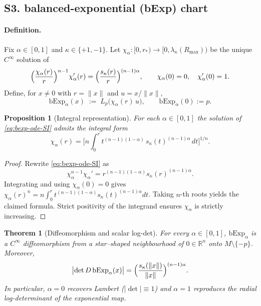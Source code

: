 \documentclass{article}
\newtheorem{theorem}{Theorem}
\newtheorem{proposition}{Proposition}
\theoremstyle{definition}
\theoremstyle{remark}
\begin{document}
\subsection*{S3. balanced-exponential (bExp) chart}

\paragraph{Definition.}
Fix $\alpha\in[0,1]$ and $\kappa\in\{+1,-1\}$. Let $\chi_\alpha:[0,r_*)\to[0,\lambda_\kappa(R_{\max}))$ be the unique
$C^\infty$ solution of
\begin{equation}
\Bigl(\frac{\chi_\alpha(r)}{r}\Bigr)^{n-1}\chi'_\alpha(r)
=
\Bigl(\frac{s_\kappa(r)}{r}\Bigr)^{(n-1)\alpha},
\qquad
\chi_\alpha(0)=0,\quad \chi'_\alpha(0)=1.
\label{eq:bexp-ode-SI}
\end{equation}
Define, for $x\neq0$ with $r=\|x\|$ and $u=x/\|x\|$,
\[
\mathrm{bExp}_\alpha(x)\;:=\;L_p\bigl(\chi_\alpha(r)\,u\bigr),\qquad
\mathrm{bExp}_\alpha(0):=p.
\]

\begin{proposition}[Integral representation]\label{prop:bexp-integral}
For each $\alpha\in[0,1]$ the solution of \eqref{eq:bexp-ode-SI} admits the integral form
\[
\chi_\alpha(r)
=
\Biggl[
n\int_0^r t^{(n-1)(1-\alpha)}\,s_\kappa(t)^{(n-1)\alpha}\,dt
\Biggr]^{1/n}.
\]
\end{proposition}

\begin{proof}
Rewrite \eqref{eq:bexp-ode-SI} as
\[
\chi_\alpha^{n-1}\chi_\alpha' = r^{(n-1)(1-\alpha)}s_\kappa(r)^{(n-1)\alpha}.
\]
Integrating and using $\chi_\alpha(0)=0$ gives
$\chi_\alpha(r)^n = n\int_0^r t^{(n-1)(1-\alpha)}s_\kappa(t)^{(n-1)\alpha}dt$.
Taking $n$-th roots yields the claimed formula. Strict positivity of the integrand ensures
$\chi_\alpha$ is strictly increasing.
\end{proof}

\begin{theorem}[Diffeomorphism and scalar log-det]
For every $\alpha\in[0,1]$, $\mathrm{bExp}_\alpha$ is a $C^\infty$ diffeomorphism from a star--shaped
neighbourhood of $0\in\mathbb R^n$ onto $M\setminus\{-p\}$. Moreover,
\begin{equation}
\bigl|\det D\,\mathrm{bExp}_\alpha(x)\bigr|
=\Bigl(\frac{s_\kappa(\|x\|)}{\|x\|}\Bigr)^{(n-1)\alpha}.
\label{eq:bexp-logdet-SI}
\end{equation}
In particular, $\alpha=0$ recovers Lambert ($|\det| \equiv 1$) and $\alpha=1$ reproduces the radial
log-determinant of the exponential map.
\end{theorem}
\end{document}
